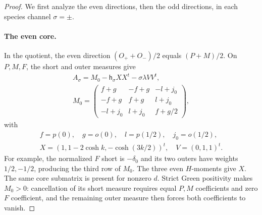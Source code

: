 \begin{proof}
We first analyze the even directions, then the odd directions, in each species channel \(\sigma=\pm\).

\paragraph{The even core.}
In the quotient, the even direction \((O_++O_-)/2\) equals \((P+M)/2\). On \(P,M,F\), the short and outer measures give
\begin{equation}\label{j:stability-core}
\begin{gathered}
A_\sigma=M_0-\mathsf h_\sigma XX^t-\sigma\lambda VV^t,\\
M_0=
\begin{pmatrix}
f+g&-f+g&-l+j_0\\
-f+g&f+g&l+j_0\\
-l+j_0&l+j_0&f+g/2
\end{pmatrix},
\end{gathered}
\end{equation}
with
\[
\begin{gathered}
f=p(0),\quad g=o(0),\quad l=p(1/2),\quad j_0=o(1/2),\\
X=(1,1-2\cosh k,-\cosh(3k/2))^t,\quad V=(0,1,1)^t.
\end{gathered}
\]
For example, the normalized \(F\) short is \(-\delta_0\) and its two outers have weights \(1/2,-1/2\), producing the third row of \(M_0\). The three even \(H\)-moments give \(X\). The same core submatrix is present for nonzero \(d\). Strict Green positivity makes \(M_0>0\): cancellation of its short measure requires equal \(P,M\) coefficients and zero \(F\) coefficient, and the remaining outer measure then forces both coefficients to vanish.


\end{proof}
